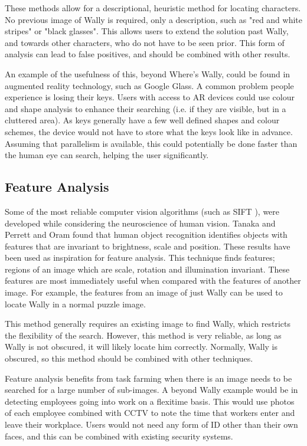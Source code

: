 \documentclass[../main.tex]{subfiles}
\begin{document}
    These methods allow for a descriptional, heuristic method for locating characters.
    No previous image of Wally is required, only a description, such as "red and white stripes" or "black glasses".
    This allows users to extend the solution past Wally, and towards other characters, who do not have to be seen prior.
    This form of analysis can lead to false positives, and should be combined with other results.

    An example of the usefulness of this, beyond Where's Wally, could be found in augmented reality technology, such as Google Glass.
    A common problem people experience is losing their keys.
    Users with access to AR devices could use colour and shape analysis to enhance their searching (i.e. if they are visible, but in a cluttered area).
    As keys generally have a few well defined shapes and colour schemes, the device would not have to store what the keys look like in advance.
    Assuming that parallelism is available, this could potentially be done faster than the human eye can search, helping the user significantly.
    
    \subsection{Feature Analysis}
    Some of the most reliable computer vision algorithms (such as SIFT \cite{sift}), were developed while considering the neuroscience of human vision.
    Tanaka\cite{mechobjrecog} and Perrett and Oram\cite{perretthv} found that human object recognition identifies objects with features that are invariant to brightness, scale and position.
    These results have been used as inspiration for feature analysis.
    This technique finds features; regions of an image which are scale, rotation and illumination invariant.
    These features are most immediately useful when compared with the features of another image.
    For example, the features from an image of just Wally can be used to locate Wally in a normal puzzle image.

    This method generally requires an existing image to find Wally, which restricts the flexibility of the search.
    However, this method is very reliable, as long as Wally is not obscured, it will likely locate him correctly.
    Normally, Wally is obscured, so this method should be combined with other techniques.

    Feature analysis benefits from task farming when there is an image needs to be searched for a large number of sub-images.
    A beyond Wally example would be in detecting employees going into work on a flexitime basis.
    This would use photos of each employee combined with CCTV to note the time that workers enter and leave their workplace.
    Users would not need any form of ID other than their own faces, and this can be combined with existing security systems.    
    \biblio
\end{document}

